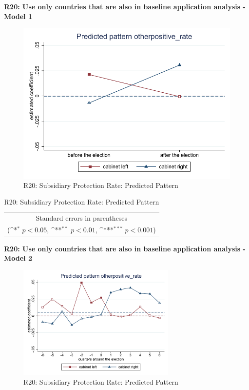 \documentclass[10pt,a4paper]{scrartcl}
\begin{document}
\clearpage
\textbf{R20: Use only countries that are also in baseline application analysis - Model 1}
\begin{figure}[!ht]
	\centering
	\includegraphics[width=1\textwidth]{figures_edited/otherpositive_rate_graph1_R20.pdf}
	\caption{R20: Subsidiary Protection Rate: Predicted Pattern}
\end{figure}

\begin{table}[!ht]\centering
	\renewcommand{\arraystretch}{1.25}
	\def\sym#1{\ifmmode^{#1}\else\(^{#1}\)\fi}
	\caption{R20: Subsidiary Protection Rate: Predicted Pattern}
	\begin{tabular}{l*{2}{c}}
		\hline\hline
		
		\hline\hline
		\multicolumn{3}{c}{\footnotesize Standard errors in parentheses} \\
		\multicolumn{3}{c}{\footnotesize (\sym{*} \(p<0.05\), \sym{**} \(p<0.01\), \sym{***} \(p<0.001\))}\\
	\end{tabular}
\end{table}

\clearpage
\textbf{R20: Use only countries that are also in baseline application analysis - Model 2}
\begin{figure}[!ht]
	\centering
	\includegraphics[width=0.7\textwidth]{figures_edited/otherpositive_rate_graph2_R20.pdf}
	\caption{R20: Subsidiary Protection Rate: Predicted Pattern}
\end{figure}
\end{document}
